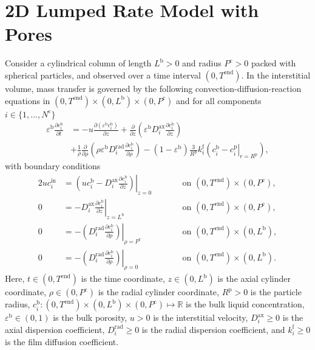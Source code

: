 \documentclass{article}
\begin{document}
\section*{2D Lumped Rate Model with Pores}
Consider a cylindrical column of length $L^{\mathrm{b}} > 0$ and radius $P^{\mathrm{c}} > 0$ packed with spherical particles, and observed over a time interval $(0, T^{\mathrm{end}})$.
In the interstitial volume, mass transfer is governed by the following convection-diffusion-reaction equations in $(0, T^{\mathrm{end}})\times (0, L^{\mathrm{b}})\times (0, P^{\mathrm{c}})$ and for all components $i\in\{1, \dots, N^{\mathrm{c}} \}$
\begin{align}
    \varepsilon^{\mathrm{b}} \frac{\partial c^{\mathrm{b}}_{i}}{\partial t}
    &= - u \frac{\partial \left( \varepsilon^{\mathrm{b}} c^{\mathrm{b}}_{i} \right)}{\partial z}
        + \frac{\partial}{\partial z} \left( \varepsilon^{\mathrm{b}} D^{\mathrm{ax}}_{i} \frac{\partial c^{\mathrm{b}}_{i}}{\partial z} \right) \nonumber
    \\
    &+ \frac{1}{\rho} \frac{\partial}{\partial \rho} \left( \rho \varepsilon^{\mathrm{b}} D^{\mathrm{rad}}_{i} \frac{\partial c^{\mathrm{b}}_{i}}{\partial \rho} \right)
        - \left(1 - \varepsilon^{\mathrm{b}} \right) \frac{3}{R^{\mathrm{p}}} k^{\mathrm{f}}_{i} \left(c^{\mathrm{b}}_{i} - \left. c^{\mathrm{p}}_{i} \right|_{r = R^{\mathrm{p}}} \right),
\end{align}
with boundary conditions
\begin{alignat}{2}
    u c^{\mathrm{in}}_{i}
    &= \left.\left( u c^{\mathrm{b}}_{i} - D^{\mathrm{ax}}_{i} \frac{\partial c^{\mathrm{b}}_{i}}{\partial z}\right)\right|_{z=0}
    & & \qquad\text{on }(0, T^{\mathrm{end}})\times (0, P^{\mathrm{c}}),
    \\
    0
    &= - D^{\mathrm{ax}}_{i} \left. \frac{\partial c^{\mathrm{b}}_{i}}{\partial z} \right|_{z=L^{\mathrm{b}}}
    & & \qquad\text{on }(0, T^{\mathrm{end}})\times (0, P^{\mathrm{c}}),
    \\
    0
    &= - \left(D^{\mathrm{rad}}_{i} \left. \frac{\partial c^{\mathrm{b}}_{i}}{\partial \rho} \right) \right|_{\rho=P^{\mathrm{c}}}
    & & \qquad\text{on }(0, T^{\mathrm{end}}) \times (0, L^{\mathrm{b}}),
    \\
    0
    &= - \left(D^{\mathrm{rad}}_{i} \left. \frac{\partial c^{\mathrm{b}}_{i}}{\partial \rho} \right) \right|_{\rho=0}
    & & \qquad\text{on }(0, T^{\mathrm{end}}) \times (0, L^{\mathrm{b}}).
\end{alignat}
Here, $t\in (0, T^{\mathrm{end}})$ is the time coordinate, $z\in (0, L^{\mathrm{b}})$ is the axial cylinder coordinate, $\rho\in (0, P^{\mathrm{c}})$ is the radial cylinder coordinate, $R^{\mathrm{p}}> 0$ is the particle radius, $c^{\mathrm{b}}_{i}\colon (0, T^{\mathrm{end}})\times (0, L^{\mathrm{b}})\times (0, P^{\mathrm{c}}) \mapsto \mathbb{R}$ is the bulk liquid concentration, $\varepsilon^{\mathrm{b}}\in (0, 1)$ is the bulk porosity, $u> 0$ is the interstitial velocity, $D^{\mathrm{ax}}_{i}\geq 0$ is the axial dispersion coefficient, $D^{\mathrm{rad}}_{i}\geq 0$ is the radial dispersion coefficient, and $k^{\mathrm{f}}_{i}\geq 0$ is the film diffusion coefficient.
\end{document}

